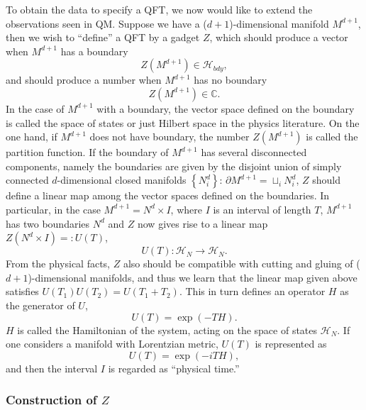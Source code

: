 To obtain the data to specify a QFT, we now would like to extend the
observations seen in QM. Suppose we have a ($d+1$)-dimensional manifold
$M^{d+1}$, then we wish to ``define'' a QFT by a gadget $Z$, which
should produce a vector when $M^{d+1}$ has a boundary 
\begin{equation}
Z\left(M^{d+1}\right)  \in  \mathcal{H}_{bdy},
\end{equation}
 and should produce a number when $M^{d+1}$ has no boundary 
\begin{equation}
Z\left(M^{d+1}\right)  \in  \mathbb{C}.
\end{equation}
In the case of $M^{d+1}$ with a boundary, the vector space defined
on the boundary is called the space of states or just Hilbert space
in the physics literature. On the one hand, if $M^{d+1}$ does not
have boundary, the number $Z\left(M^{d+1}\right)$ is called the partition
function. If the boundary of $M^{d+1}$ has several disconnected components,
namely the boundaries are given by the disjoint union of simply connected
$d$-dimensional closed manifolds $\left\{ N_{i}^{d}\right\} $: $\partial M^{d+1}=\sqcup_{i}N_{i}^{d}$,
$Z$ should define a linear map among the vector spaces defined on
the boundaries. In particular, in the case $M^{d+1}=N^{d}\times I$,
where $I$ is an interval of length $T$, $M^{d+1}$ has two boundaries
$N^{d}$ and $Z$ now gives rise to a linear map $Z\left(N^{d}\times I\right)=:U\left(T\right)$,
\begin{equation}
  U\left(T\right)  :  \mathcal{H}_{N}  \longrightarrow  \mathcal{H}_{N}.
\end{equation}
From the physical facts, $Z$ also should be compatible with cutting and
gluing of ($d+1$)-dimensional manifolds, and thus we learn that the
linear map given above satisfies $U\left(T_{1}\right)U\left(T_{2}\right) = U\left(T_{1}+T_{2}\right)$.
This in turn defines an operator $H$ as the generator of $U$, 
\begin{equation}
  U\left(T\right)  =  \exp\left(-TH\right).
\end{equation}
 $H$ is called the Hamiltonian of the system, acting on the space
of states $\mathcal{H}_{N}$. If one considers a manifold
with Lorentzian metric, $U\left(T\right)$ is represented as 
\begin{equation}
  U\left(T\right)  =  \exp\left(-iTH\right),
\end{equation}
and then the interval $I$ is regarded as ``physical time.'' 

\subsubsection{Construction of $Z$}

